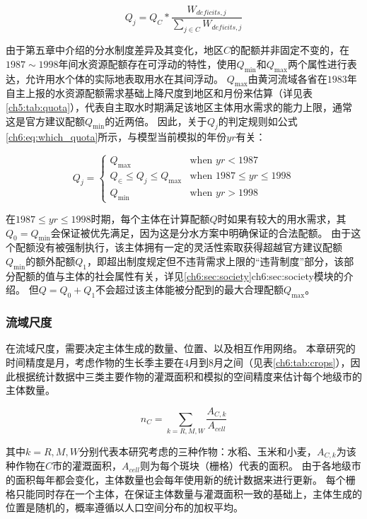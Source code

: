 \begin{equation}
    \label{ch6:eq:quota}
    Q_j = Q_{C} * \frac{W_{deficits, j}}{\sum_{j \in C} W_{deficits, j}}
\end{equation}

由于第五章中介绍的分水制度差异及其变化，地区$C$的配额并非固定不变的，在$1987 \sim 1998$年间水资源配额存在可浮动的特性，使用$Q_{\min}$和$Q_{\max}$两个属性进行表达，允许用水个体的实际地表取用水在其间浮动。
$Q_{\max}$由黄河流域各省在$1983$年自主上报的水资源配额需求基础上降尺度到地区和月份来估算（详见表\ref{ch5:tab:quota}），代表自主取水时期满足该地区主体用水需求的能力上限，通常这是官方建议配额$Q_{\min}$的近两倍。
因此，关于$Q_j$的判定规则如公式\ref{ch6:eq:which_quota}所示，与模型当前模拟的年份$yr$有关：

\begin{equation}
    \label{ch6:eq:which_quota}
    Q_j =
    \begin{cases}
        Q_{\max} & \text{when } yr < 1987 \\
        Q_{\in} \leq Q_j \leq Q_{\max} & \text{when } 1987 \leq yr \leq 1998 \\
        Q_{\min} & \text{when } yr > 1998
    \end{cases}
\end{equation}

在$1987 \leq yr \leq 1998$时期，每个主体在计算配额$Q$时如果有较大的用水需求，其$Q_{0} = Q_{\min}$会保证被优先满足，因为这是分水方案中明确保证的合法配额。
由于这个配额没有被强制执行，该主体拥有一定的灵活性索取获得超越官方建议配额$Q_{\min}$的额外配额$Q_{1}$，即超出制度规定但不违背需求上限的“违背制度”部分，该部分配额的值与主体的社会属性有关，详见\ref{ch6:sec:society}\refname{ch6:sec:society}模块的介绍。
但$Q = Q_{0} + Q_{1}$不会超过该主体能被分配到的最大合理配额$Q_{\max}$。

\subsubsection*{流域尺度}

在流域尺度，需要决定主体生成的数量、位置、以及相互作用网络。
本章研究的时间精度是月，考虑作物的生长季主要在$4$月到$8$月之间（见表\ref{ch6:tab:crops}），因此根据统计数据中三类主要作物的灌溉面积和模拟的空间精度来估计每个地级市的主体数量。

\begin{equation}
    n_{C} = \sum_{k=R, M, W}\frac{A_{C, k}}{A_{cell}}
\end{equation}

其中$k = R, M, W$分别代表本研究考虑的三种作物：水稻、玉米和小麦，$A_{C, k}$为该种作物在$C$市的灌溉面积，$A_{cell}$则为每个斑块（栅格）代表的面积。
由于各地级市的面积每年都会变化，主体数量也会每年使用新的统计数据来进行更新。
每个栅格只能同时存在一个主体，在保证主体数量与灌溉面积一致的基础上，主体生成的位置是随机的，概率遵循以人口空间分布的加权平均。

